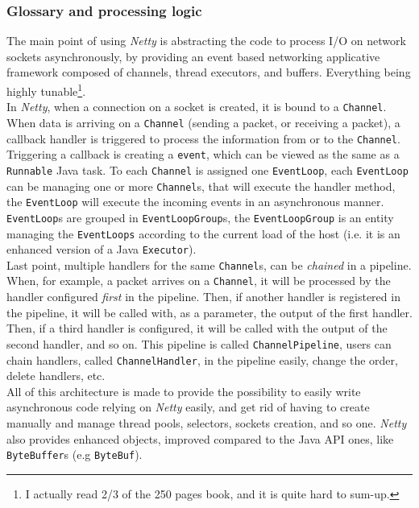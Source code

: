 \documentclass[a4paper]{report}
\begin{document}
\subsubsection{Glossary and processing logic}
The main point of using \emph{Netty} is abstracting the code to process I/O on network sockets asynchronously, by providing an event based networking applicative framework composed of channels, thread executors, and buffers. Everything being highly tunable\footnote{I actually read 2/3 of the 250 pages book, and it is quite hard to sum-up.}.\\
In \emph{Netty}, when a connection on a socket is created, it is bound to a \verb;Channel;. When data is arriving on a \verb;Channel; (sending a packet, or receiving a packet), a callback handler is triggered to process the information from or to the \verb;Channel;. Triggering a callback is creating a \verb;event;, which can be viewed as the same as a \verb;Runnable; Java task. To each \verb;Channel; is assigned one \verb;EventLoop;, each \verb;EventLoop; can be managing one or more \verb;Channel;s, that will execute the handler method, the \verb;EventLoop; will execute the incoming events in an asynchronous manner.\\
\verb;EventLoop;s are grouped in \verb;EventLoopGroup;s, the \verb;EventLoopGroup; is an entity managing the \verb;EventLoops; according to the current load of the host (i.e. it is an enhanced version of a Java \verb;Executor;).\\
Last point, multiple handlers for the same \verb;Channel;s, can be \emph{chained} in a pipeline. When, for example, a packet arrives on a \verb;Channel;, it will be processed by the handler configured \emph{first} in the pipeline. Then, if another handler is registered in the pipeline, it will be called with, as a parameter, the output of the first handler. Then, if a third handler is configured, it will be called with the output of the second handler, and so on. This pipeline is called \verb;ChannelPipeline;, users can chain handlers, called \verb;ChannelHandler;, in the pipeline easily, change the order, delete handlers, etc.\\
All of this architecture is made to provide the possibility to easily write asynchronous code relying on \emph{Netty} easily, and get rid of having to create manually and manage thread pools, selectors, sockets creation, and so one. \emph{Netty} also provides enhanced objects, improved compared to the Java API ones, like \verb;ByteBuffer;s (e.g \verb;ByteBuf;).
\end{document}
